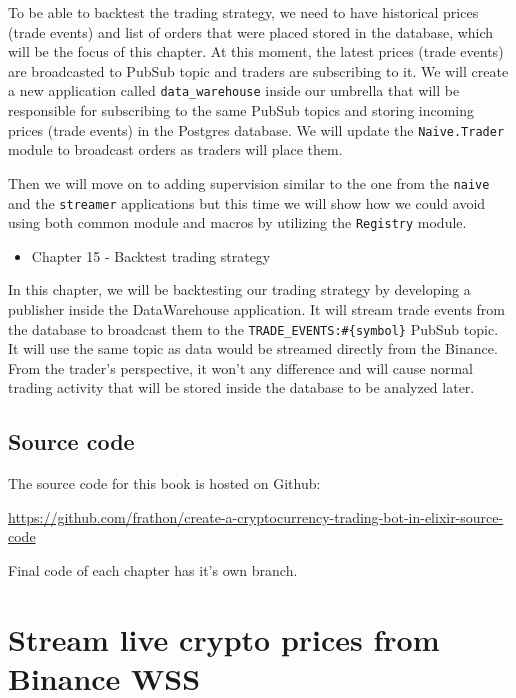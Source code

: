 \documentclass[
  oneside]{book}
\providecommand{\tightlist}{%
  \setlength{\itemsep}{0pt}\setlength{\parskip}{0pt}}
\begin{document}
To be able to backtest the trading strategy, we need to have historical prices (trade events) and list of orders that were placed stored in the database, which will be the focus of this chapter. At this moment, the latest prices (trade events) are broadcasted to PubSub topic and traders are subscribing to it. We will create a new application called \texttt{data\_warehouse} inside our umbrella that will be responsible for subscribing to the same PubSub topics and storing incoming prices (trade events) in the Postgres database. We will update the \texttt{Naive.Trader} module to broadcast orders as traders will place them.

Then we will move on to adding supervision similar to the one from the \texttt{naive} and the \texttt{streamer} applications but this time we will show how we could avoid using both common module and macros by utilizing the \texttt{Registry} module.

\begin{itemize}
\tightlist
\item
  Chapter 15 - Backtest trading strategy
\end{itemize}

In this chapter, we will be backtesting our trading strategy by developing a publisher inside the DataWarehouse application. It will stream trade events from the database to broadcast them to the \texttt{TRADE\_EVENTS:\#\{symbol\}} PubSub topic. It will use the same topic as data would be streamed directly from the Binance. From the trader's perspective, it won't any difference and will cause normal trading activity that will be stored inside the database to be analyzed later.

\hypertarget{source-code}{%
\section*{Source code}\label{source-code}}

The source code for this book is hosted on Github:

\url{https://github.com/frathon/create-a-cryptocurrency-trading-bot-in-elixir-source-code}

Final code of each chapter has it's own branch.

\hypertarget{stream-live-crypto-prices-from-binance-wss}{%
\chapter{Stream live crypto prices from Binance WSS}\label{stream-live-crypto-prices-from-binance-wss}}
\end{document}
